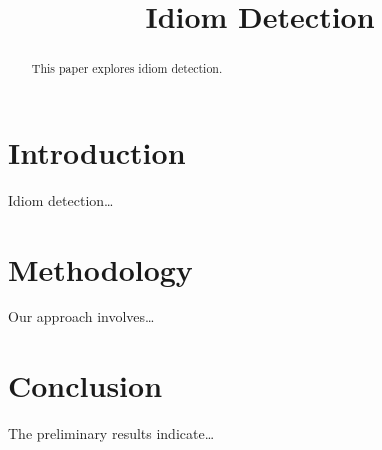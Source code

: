 \documentclass[conference]{IEEEtran}
\begin{document}
	
	\title{Idiom Detection}
	\author{
		\IEEEauthorblockA{\today}}  %

	\maketitle

	\begin{abstract}
		This paper explores idiom detection.
	\end{abstract}

	\section{Introduction}
	Idiom detection\ldots

	\section{Methodology}
	Our approach involves\ldots

	\section{Conclusion}
	The preliminary results indicate\ldots
	
\end{document}
